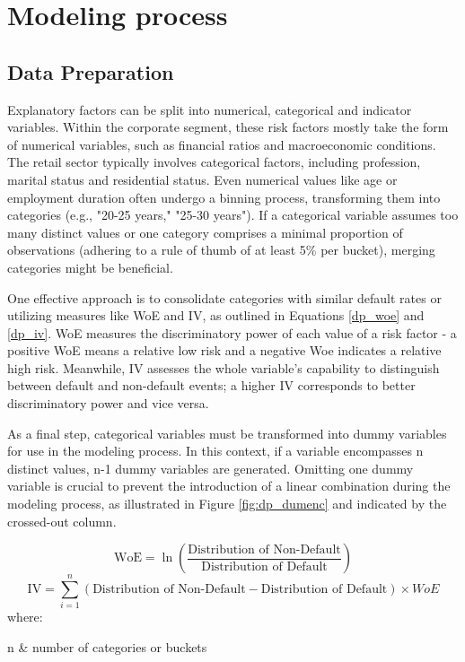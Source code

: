 \chapter{Modeling process}
\label{ch:MP}

\section{Data Preparation}
\label{sec:dataprep}
Explanatory factors can be split into numerical, categorical and indicator variables. Within the corporate segment, these risk factors mostly take the form of numerical variables, such as financial ratios and macroeconomic conditions. The retail sector typically involves categorical factors, including profession, marital status and residential status. Even numerical values like age or employment duration often undergo a binning process, transforming them into categories (e.g., "20-25 years," "25-30 years"). If a categorical variable assumes too many distinct values or one category comprises a minimal proportion of observations (adhering to a rule of thumb of at least 5\% per bucket), merging categories might be beneficial.

One effective approach is to consolidate categories with similar default rates or utilizing measures like \ac{WoE} and \ac{IV}, as outlined in Equations \ref{dp_woe} and \ref{dp_iv}. WoE measures the discriminatory power of each value of a risk factor - a positive WoE means a relative low risk and a negative Woe indicates a relative high risk. Meanwhile, IV assesses the whole variable's capability to distinguish between default and non-default events; a higher IV corresponds to better discriminatory power and vice versa.

As a final step, categorical variables must be transformed into dummy variables for use in the modeling process. In this context, if a variable encompasses n distinct values, n-1 dummy variables are generated. Omitting one dummy variable is crucial to prevent the introduction of a linear combination during the modeling process, as illustrated in Figure \ref{fig:dp_dumenc} and indicated by the crossed-out column. \cite[pp.~47-51]{Witzany:2017}

\begin{equation}
\text{WoE} = \ln\left(\frac{\text{Distribution of Non-Default}}{\text{Distribution of Default}}\right) \label{dp_woe}
\end{equation}
\begin{equation}
\text{IV} = \sum_{i=1}^{n} (\text{Distribution of Non-Default} - \text{Distribution of Default}) \times WoE \label{dp_iv}
\end{equation}
where:
\begin{conditions}
n  	& number of categories or buckets 
\end{conditions}

